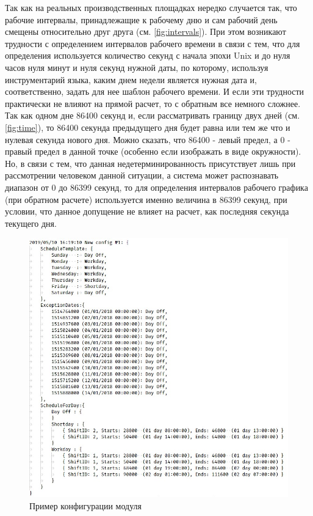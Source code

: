 \indent Так как на реальных производственных площадках нередко случается так, что рабочие интервалы, принадлежащие к рабочему дню и сам рабочий день смещены относительно друг друга (см. \ref{fig:intervals}).
При этом возникают трудности с определением интервалов рабочего времени в связи с тем, что для определения используется количество секунд с начала эпохи Unix и до нуля часов нуля минут и нуля секунд нужной даты, по которому, используя инструментарий языка, каким днем недели является нужная дата и, соответственно, задать для нее шаблон рабочего времени.
И если эти трудности практически не влияют на прямой расчет, то с обратным все немного сложнее.
Так как одном дне 86400 секунд и, если рассматривать границу двух дней (см. \ref{fig:time}), то 86400 секунда предыдущего дня будет равна или тем же что и нулевая секунда нового дня.
Можно сказать, что 86400 - левый предел, а 0 - правый предел в данной точке (особенно если изображать в виде окружности).
Но, в связи с тем, что данная недетерминированность присутствует лишь при рассмотрении человеком данной ситуации, а система может распознавать диапазон от 0 до 86399 секунд, то для определения интервалов рабочего графика (при обратном расчете) используется именно величина в 86399 секунд, при условии, что данное допущение не влияет на расчет, как последняя секунда текущего дня.

\begin{figure}[ht]
	\centering
	\includegraphics[scale=0.6]{pics/scheduleConfigExample.png}
	\caption{Пример конфигурации модуля}
	\label{fig:config}
\end{figure}

